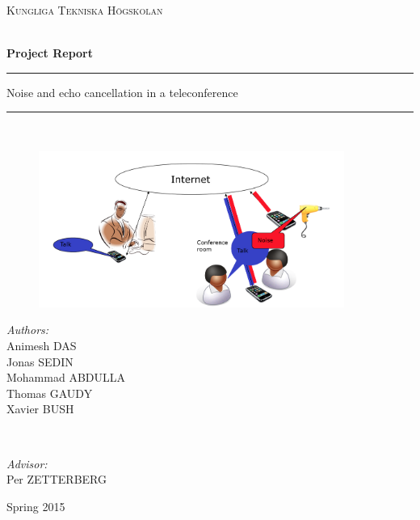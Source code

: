 \documentclass[11pt,a4paper,english]{book}  %
\newcommand{\HRule}{\rule{\linewidth}{0.5mm}}
\theoremstyle{definition}  %
\theoremstyle{plain}  %
\theoremstyle{remark}  %
\begin{document}
\begin{titlepage}
\begin{center}


\textsc{\LARGE Kungliga Tekniska Högskolan}\\[1.5cm]

\textsc{\Large ~}\\[-0.5cm]


{ \huge \bfseries \textbf{Project Report} \\

\HRule

 Noise and echo cancellation in a teleconference\\[0.4cm]}

\HRule \\[1.1cm]

		\begin{figure}[h]
		\centering
		\includegraphics[width=10cm]{images/other/scenario}
		\label{scenario}
		\end{figure}

\begin{minipage}{0.4\textwidth}
\begin{flushleft}
\emph{Authors:}\\
Animesh DAS \\ Jonas SEDIN \\ Mohammad ABDULLA \\ Thomas GAUDY \\ Xavier BUSH
\end{flushleft}
\end{minipage}
~
\begin{minipage}{0.4\textwidth}
\begin{flushright}
\emph{Advisor:}\\
Per ZETTERBERG
\end{flushright}
\end{minipage}

\vfill

{\large Spring 2015} \\[1cm]
\end{center}



\end{titlepage}
\restoregeometry
\end{document}
